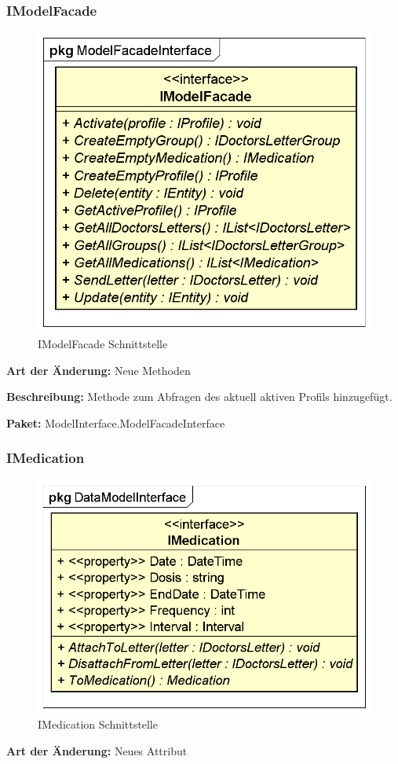 \documentclass[a4paper]{scrreprt}
\begin{document}
\subsubsection{IModelFacade}
\begin{figure}[H]
\centering
\includegraphics[width=0.75\textheight]{graphics/Klassendiagramme/Model/IModelFacade.png}
\caption{IModelFacade Schnittstelle}
\end{figure}
\textbf{Art der Änderung:} Neue Methoden

\textbf{Beschreibung:} Methode zum Abfragen des aktuell aktiven Profils hinzugefügt.

\textbf{Paket:} ModelInterface.ModelFacadeInterface

\subsubsection{IMedication}
\begin{figure}[H]
\centering
\includegraphics[width=0.75\textheight]{graphics/Klassendiagramme/Model/IMedication.png}
\caption{IMedication Schnittstelle}
\end{figure}
\textbf{Art der Änderung:} Neues Attribut
\end{document}
